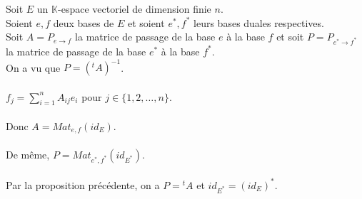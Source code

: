 \documentclass{article}
\begin{document}
Soit $E$ un $\mathbb{K}$-espace vectoriel de dimension finie $n$.\\
Soient $e, f$ deux bases de $E$ et soient $e^*, f^*$ leurs bases duales respectives.\\
Soit $A = P_{e \to f}$ la matrice de passage de la base $e$ à la base $f$ et soit $P = P_{e^* \to f^*}$ la matrice de passage de la base $e^*$ à la base $f^*$.\\
On a vu que $P = ({ }^t A)^{-1}$.\\\\
$f_j = \sum_{i=1}^n A_{ij} e_i$ pour $j \in \{1, 2, \ldots, n\}$.\\\\
Donc $A = Mat_{e, f}(id_E)$.\\\\
De même, $P = Mat_{e^*, f^*}(id_{E^*})$.\\\\
Par la proposition précédente, on a $P = { }^t A$ et $id_{E^*} = (id_E)^{*}$.

\newpage
\tableofcontents
\end{document}
